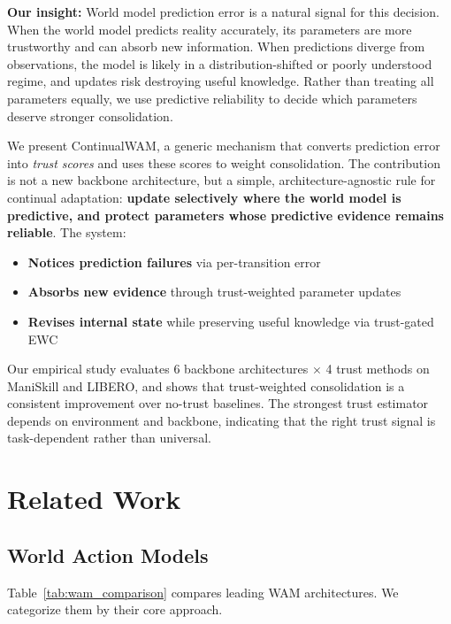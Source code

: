 \documentclass{article}
\begin{document}
\textbf{Our insight:} World model prediction error is a natural signal for this decision. When the world model predicts reality accurately, its parameters are more trustworthy and can absorb new information. When predictions diverge from observations, the model is likely in a distribution-shifted or poorly understood regime, and updates risk destroying useful knowledge. Rather than treating all parameters equally, we use predictive reliability to decide which parameters deserve stronger consolidation.

We present ContinualWAM, a generic mechanism that converts prediction error into \emph{trust scores} and uses these scores to weight consolidation. The contribution is not a new backbone architecture, but a simple, architecture-agnostic rule for continual adaptation: \textbf{update selectively where the world model is predictive, and protect parameters whose predictive evidence remains reliable}. The system:
\begin{itemize}
\item \textbf{Notices prediction failures} via per-transition error
\item \textbf{Absorbs new evidence} through trust-weighted parameter updates
\item \textbf{Revises internal state} while preserving useful knowledge via trust-gated EWC
\end{itemize}

Our empirical study evaluates 6 backbone architectures $\times$ 4 trust methods on ManiSkill and LIBERO, and shows that trust-weighted consolidation is a consistent improvement over no-trust baselines. The strongest trust estimator depends on environment and backbone, indicating that the right trust signal is task-dependent rather than universal.

\section{Related Work}

\subsection{World Action Models}

Table~\ref{tab:wam_comparison} compares leading WAM architectures. We categorize them by their core approach.
\end{document}
